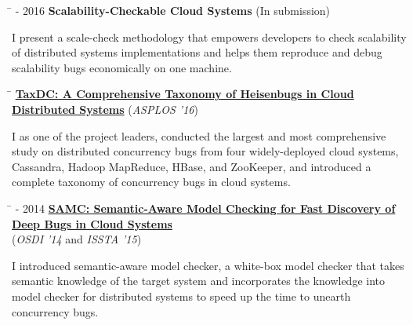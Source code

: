 \documentclass[10pt]{article} %
\begin{document}
\begin{tabbing}
\hspace{2.5cm} \=  - 2016 \>\+ \textbf{Scalability-Checkable Cloud Systems} (In submission) \\
\begin{minipage}{\smallertextwidth}
I present a scale-check methodology that empowers developers to check
scalability of distributed systems implementations and helps them reproduce and
debug scalability bugs economically on one machine.
\end{minipage}
\end{tabbing}

\begin{tabbing}
\hspace{2.5cm} \=  \>\+ \href{http://ucare.cs.uchicago.edu/pdf/asplos16-TaxDC.pdf}{\textbf{TaxDC: A Comprehensive Taxonomy of Heisenbugs in Cloud Distributed Systems}} (\textit{ASPLOS '16}) \\
\begin{minipage}{\smallertextwidth}
I as one of the project leaders, conducted the largest and most comprehensive
study on distributed concurrency bugs from four widely-deployed
cloud systems, Cassandra, Hadoop MapReduce, HBase, and ZooKeeper, and introduced
a complete taxonomy of concurrency bugs in cloud systems.
\end{minipage}
\end{tabbing}

\begin{tabbing}
\hspace{2.5cm} \=  - 2014 \> \href{http://ucare.cs.uchicago.edu/pdf/osdi14-samc.pdf}{\textbf{SAMC: Semantic-Aware Model Checking for Fast Discovery of Deep Bugs in Cloud Systems}} \\
\>\+ (\textit{OSDI '14} and \textit{ISSTA '15}) \\
\begin{minipage}{\smallertextwidth}
I introduced semantic-aware model checker, a white-box model checker that takes
semantic knowledge of the target system and incorporates the knowledge into
model checker for distributed systems to speed up the time to unearth concurrency bugs.
\end{minipage}
\end{tabbing}

\end{document}
